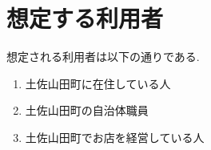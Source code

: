 \section{想定する利用者}
想定される利用者は以下の通りである.
\begin{enumerate}
    \renewcommand{\labelenumi}{・}
    \item 土佐山田町に在住している人
    \item 土佐山田町の自治体職員
    \item 土佐山田町でお店を経営している人
\end{enumerate}
